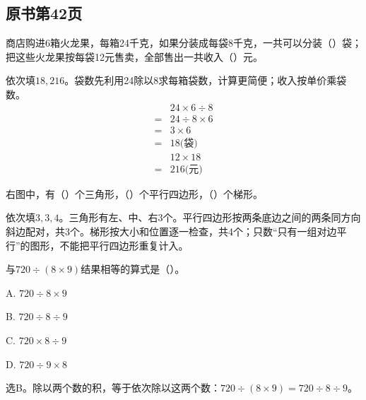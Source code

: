 

\subsection*{原书第42页}

商店购进6箱火龙果，每箱24千克，如果分装成每袋8千克，一共可以分装（\hspace{1.8em}）袋；把这些火龙果按每袋12元售卖，全部售出一共收入（\hspace{1.8em}）元。\par
\begin{BookAnswer}
依次填\(18,216\)。袋数先利用24除以8求每箱袋数，计算更简便；收入按单价乘袋数。\[\begin{aligned}&24\times6\div8\\={}&24\div8\times6\\={}&3\times6\\={}&18\text{(袋)}\\&12\times18\\={}&216\text{(元)}\end{aligned}\]
\end{BookAnswer}

右图中，有（\hspace{1.8em}）个三角形，（\hspace{1.8em}）个平行四边形，（\hspace{1.8em}）个梯形。\par
{}
\begin{BookAnswer}
依次填\(3,3,4\)。三角形有左、中、右3个。平行四边形按两条底边之间的两条同方向斜边配对，共3个。梯形按大小和位置逐一检查，共4个；只数“只有一组对边平行”的图形，不能把平行四边形重复计入。
\end{BookAnswer}

与\(720\div(8\times9)\)结果相等的算式是（\hspace{1.8em}）。\par
\noindent A. \(720\div8\times9\)\par
\noindent B. \(720\div8\div9\)\par
\noindent C. \(720\times8\div9\)\par
\noindent D. \(720\div9\times8\)\par
\begin{BookAnswer}
选B。除以两个数的积，等于依次除以这两个数：\(720\div(8\times9)=720\div8\div9\)。
\end{BookAnswer}

